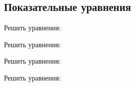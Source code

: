 \subsection*{Показательные уравнения}
\begin{enumcols}[label=\arabf]
	\item Решить уравнения:
	\begin{enumcols}[columns=3]
		\item {}
		\item {}
		\item {}
		\item {}
		\item {}
		\item {}
		\item {}
		\item {}
		\item {}
		\item {}
	\end{enumcols}
	\item Решить уравнения:
	\begin{enumcols}[columns=2]
		\item {}
		\item {}
	\end{enumcols}
	\item Решить уравнения:
	\begin{enumcols}[columns=3]
		\item {}
		\item {}
		\item {}
	\end{enumcols}
	\item Решить уравнения:
	\begin{enumcols}[columns=2]
		\item {}
		\item {}
		\item {}
		\item {}
		\item {}
		\item {}
	\end{enumcols}
\end{enumcols}